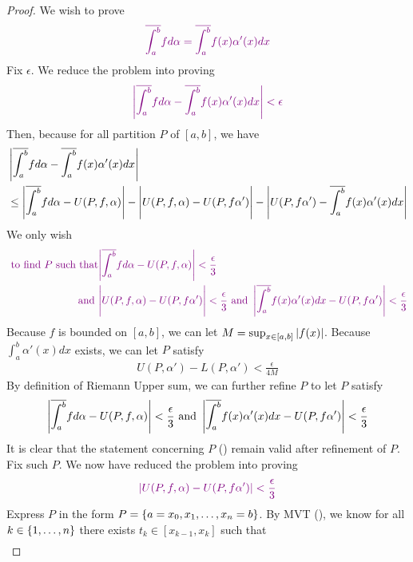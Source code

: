 \documentclass{report}
\begin{document}
\begin{proof}
We wish to prove 
\begin{align*}  \textcolor{violet}{\overline{\int_a^b}fd\alpha = \overline{\int_a^b} f(x)\alpha '(x)dx}
\end{align*}
Fix $\epsilon $. We reduce the problem into proving 
\begin{align*}  \textcolor{violet}{\left|\overline{\int_a^b}fd\alpha -\overline{\int_a^b}f(x)\alpha '(x)dx\right|<\epsilon }
\end{align*}
Then, because for all partition $P$ of  $[a,b]$, we have 
\begin{align*}  &\left|\overline{\int_a^b}fd\alpha - \overline{\int_a^b}f(x)\alpha '(x)dx\right|\\
  &\leq \left|\overline{\int_a^b} fd\alpha -U(P,f,\alpha )\right|-\Bigg|U(P,f,\alpha )-U(P,f\alpha' )\Bigg|-\left|U(P,f\alpha' )- \overline{\int_a^b} f(x)\alpha '(x)dx\right|
\end{align*}
We only wish 
\begin{align*}
\textcolor{violet}{\text{  to find $P$ such that}}&\textcolor{violet}{\left|\overline{\int_a^b}fd\alpha - U(P,f,\alpha )\right|<\frac{\epsilon}{3}}\\
\textcolor{violet}{\text{ and }}&\textcolor{violet}{\Bigg|U(P,f,\alpha )-U(P,f\alpha' )\Bigg|<\frac{\epsilon}{3}\text{ and }\left|\overline{\int_a^b}f(x)\alpha '(x)dx- U(P,f\alpha ')\right|<\frac{\epsilon}{3}}
\end{align*} 
Because $f$ is bounded on  $[a,b]$, we can let $M=\sup_{x \in [a,b]} \left|f(x)\right|$. Because $\int_a^b \alpha' (x)dx$ exists, we can let $P$ satisfy 
 \begin{align}
\label{CR3}
U(P,\alpha ')-L(P,\alpha ')<\frac{\epsilon }{4M}
\end{align}
By definition of Riemann Upper sum, we can further refine $P$ to let $P$ satisfy 
\begin{align*}
\left|\overline{\int_a^b}fd\alpha -U(P,f,\alpha )\right|<\frac{\epsilon}{3}\text{ and }\left|\overline{\int_a^b}f(x)\alpha '(x)dx- U(P,f\alpha ')\right|<\frac{\epsilon}{3}
\end{align*}
It is clear that the statement concerning $P$  () remain valid after refinement of $P$. Fix such $P$. We now have reduced the problem into proving 
\begin{align*}
  \textcolor{violet}{\left|U(P,f,\alpha )-U(P,f\alpha ')\right|<\frac{\epsilon}{3}}
\end{align*}
Express $P$ in the form $P=\{ a=x_0,x_1,\dots ,x_n=b \}$. By MVT (), we know for all $k \in \{ 1,\dots ,n \}$ there exists $t_k \in [x_{k-1},x_k]$ such that
\begin{align}

\end{align}
\end{proof}
\end{document}

